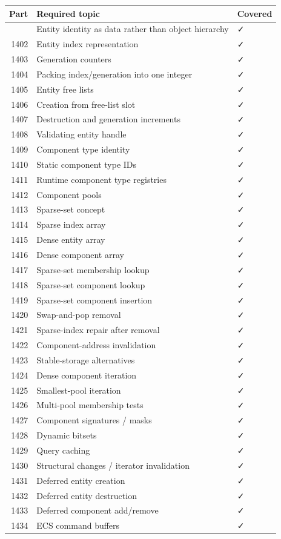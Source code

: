 {\def\LTcaptype{none} %
\begin{longtable}[]{@{}rll@{}}
\toprule\noalign{}
Part & Required topic & Covered \\
\midrule\noalign{}
\endhead
\bottomrule\noalign{}
\endlastfoot
1401 & Entity identity as data rather than object hierarchy & ✓ \\
1402 & Entity index representation & ✓ \\
1403 & Generation counters & ✓ \\
1404 & Packing index/generation into one integer & ✓ \\
1405 & Entity free lists & ✓ \\
1406 & Creation from free-list slot & ✓ \\
1407 & Destruction and generation increments & ✓ \\
1408 & Validating entity handle & ✓ \\
1409 & Component type identity & ✓ \\
1410 & Static component type IDs & ✓ \\
1411 & Runtime component type registries & ✓ \\
1412 & Component pools & ✓ \\
1413 & Sparse-set concept & ✓ \\
1414 & Sparse index array & ✓ \\
1415 & Dense entity array & ✓ \\
1416 & Dense component array & ✓ \\
1417 & Sparse-set membership lookup & ✓ \\
1418 & Sparse-set component lookup & ✓ \\
1419 & Sparse-set component insertion & ✓ \\
1420 & Swap-and-pop removal & ✓ \\
1421 & Sparse-index repair after removal & ✓ \\
1422 & Component-address invalidation & ✓ \\
1423 & Stable-storage alternatives & ✓ \\
1424 & Dense component iteration & ✓ \\
1425 & Smallest-pool iteration & ✓ \\
1426 & Multi-pool membership tests & ✓ \\
1427 & Component signatures / masks & ✓ \\
1428 & Dynamic bitsets & ✓ \\
1429 & Query caching & ✓ \\
1430 & Structural changes / iterator invalidation & ✓ \\
1431 & Deferred entity creation & ✓ \\
1432 & Deferred entity destruction & ✓ \\
1433 & Deferred component add/remove & ✓ \\
1434 & ECS command buffers & ✓ \\
\end{longtable}
}

